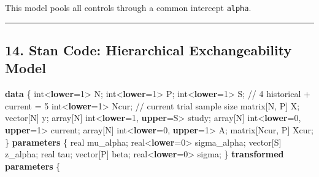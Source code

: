 \documentclass[
  letterpaper,
  DIV=11,
  numbers=noendperiod]{scrartcl}
\newenvironment{Shaded}{\begin{snugshade}}{\end{snugshade}}
\newcommand{\CommentTok}[1]{\textcolor[rgb]{0.37,0.37,0.37}{#1}}
\newcommand{\DataTypeTok}[1]{\textcolor[rgb]{0.68,0.00,0.00}{#1}}
\newcommand{\DecValTok}[1]{\textcolor[rgb]{0.68,0.00,0.00}{#1}}
\newcommand{\KeywordTok}[1]{\textcolor[rgb]{0.00,0.23,0.31}{\textbf{#1}}}
\newcommand{\NormalTok}[1]{\textcolor[rgb]{0.00,0.23,0.31}{#1}}
\begin{document}
This model pools all controls through a common intercept \texttt{alpha}.

\begin{center}\rule{0.5\linewidth}{0.5pt}\end{center}

\subsection{14. Stan Code: Hierarchical Exchangeability
Model}\label{stan-code-hierarchical-exchangeability-model}

\begin{Shaded}
\begin{Highlighting}[]
\KeywordTok{data}\NormalTok{ \{}
  \DataTypeTok{int}\NormalTok{\textless{}}\KeywordTok{lower}\NormalTok{=}\DecValTok{1}\NormalTok{\textgreater{} N;}
  \DataTypeTok{int}\NormalTok{\textless{}}\KeywordTok{lower}\NormalTok{=}\DecValTok{1}\NormalTok{\textgreater{} P;}
  \DataTypeTok{int}\NormalTok{\textless{}}\KeywordTok{lower}\NormalTok{=}\DecValTok{1}\NormalTok{\textgreater{} S;                 }\CommentTok{// 4 historical + current = 5}
  \DataTypeTok{int}\NormalTok{\textless{}}\KeywordTok{lower}\NormalTok{=}\DecValTok{1}\NormalTok{\textgreater{} Ncur;              }\CommentTok{// current trial sample size}
  \DataTypeTok{matrix}\NormalTok{[N, P] X;}
  \DataTypeTok{vector}\NormalTok{[N] y;}
  \DataTypeTok{array}\NormalTok{[N] }\DataTypeTok{int}\NormalTok{\textless{}}\KeywordTok{lower}\NormalTok{=}\DecValTok{1}\NormalTok{, }\KeywordTok{upper}\NormalTok{=S\textgreater{} study;}
  \DataTypeTok{array}\NormalTok{[N] }\DataTypeTok{int}\NormalTok{\textless{}}\KeywordTok{lower}\NormalTok{=}\DecValTok{0}\NormalTok{, }\KeywordTok{upper}\NormalTok{=}\DecValTok{1}\NormalTok{\textgreater{} current;}
  \DataTypeTok{array}\NormalTok{[N] }\DataTypeTok{int}\NormalTok{\textless{}}\KeywordTok{lower}\NormalTok{=}\DecValTok{0}\NormalTok{, }\KeywordTok{upper}\NormalTok{=}\DecValTok{1}\NormalTok{\textgreater{} A;}
  \DataTypeTok{matrix}\NormalTok{[Ncur, P] Xcur;}
\NormalTok{\}}
\KeywordTok{parameters}\NormalTok{ \{}
  \DataTypeTok{real}\NormalTok{ mu\_alpha;}
  \DataTypeTok{real}\NormalTok{\textless{}}\KeywordTok{lower}\NormalTok{=}\DecValTok{0}\NormalTok{\textgreater{} sigma\_alpha;}
  \DataTypeTok{vector}\NormalTok{[S] z\_alpha;}
  \DataTypeTok{real}\NormalTok{ tau;}
  \DataTypeTok{vector}\NormalTok{[P] beta;}
  \DataTypeTok{real}\NormalTok{\textless{}}\KeywordTok{lower}\NormalTok{=}\DecValTok{0}\NormalTok{\textgreater{} sigma;}
\NormalTok{\}}
\KeywordTok{transformed parameters}\NormalTok{ \{}

\end{Highlighting}
\end{Shaded}
\end{document}
